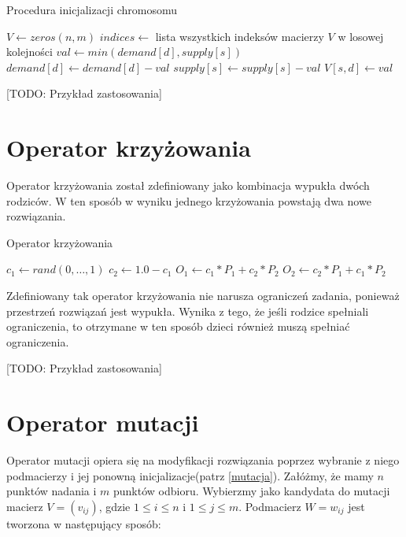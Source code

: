 \begin{pseudokod}[H]
    \label{inicjalizacja-1}
    \caption{Procedura inicjalizacji chromosomu}
    \BlankLine
    $V \gets zeros(n, m)$
    $indices \gets$ lista wszystkich indeksów macierzy $V$ w losowej kolejności\;
    \BlankLine
     {
        $val \gets min(demand[d], supply[s])$\;
        $demand[d] \gets demand[d] - val$\;
        $supply[s] \gets supply[s] - val$\;
        $V[s, d] \gets val$\;
    }

\end{pseudokod}

[TODO: Przykład zastosowania]


\section{Operator krzyżowania}
Operator krzyżowania został zdefiniowany jako kombinacja wypukła dwóch rodziców. W ten sposób w wyniku jednego krzyżowania powstają dwa nowe 
rozwiązania.

\begin{pseudokod}[H]
    \label{krzyżowanie}
    \caption{Operator krzyżowania}
    \BlankLine
    $c_1 \gets rand(0,\dots,1)$
    $c_2 \gets 1.0 - c_1$\;
    $O_1 \gets c_1 * P_1 + c_2 * P_2$\;
    $O_2 \gets c_2 * P_1 + c_1 * P_2$\;
    \;
\end{pseudokod}

Zdefiniowany tak operator krzyżowania nie narusza ograniczeń zadania, ponieważ przestrzeń rozwiązań jest wypukła. Wynika z tego, że jeśli 
rodzice spełniali ograniczenia, to otrzymane w ten sposób dzieci również muszą spełniać ograniczenia.

[TODO: Przykład zastosowania]

\section{Operator mutacji}
Operator mutacji opiera się na modyfikacji rozwiązania poprzez wybranie z niego podmacierzy i jej ponowną inicjalizacje(patrz \ref{mutacja}). 
Załóżmy, że mamy $n$ punktów nadania i $m$ punktów odbioru. Wybierzmy jako kandydata do mutacji macierz $V = (v_{ij})$, gdzie $1 \le i \le n$ i 
$1 \le j \le m$. Podmacierz $W = w_{ij}$ jest tworzona w następujący sposób:

